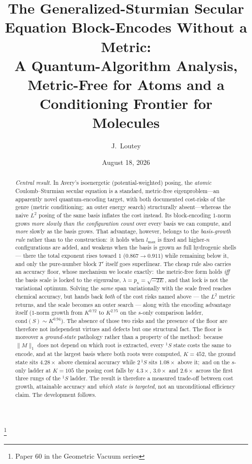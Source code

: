 \documentclass[aps,pra,twocolumn,superscriptaddress,longbibliography]{revtex4-2}
\newcommand{\gvq}[2]{#2}
\begin{document}
\title{The Generalized-Sturmian Secular Equation Block-Encodes Without a
Metric:\\
A Quantum-Algorithm Analysis, Metric-Free for Atoms and a
Conditioning Frontier for Molecules}
\thanks{Paper 60 in the Geometric Vacuum series}

\author{J.~Loutey}

\date{August 18, 2026}

\begin{abstract}
\emph{Central result.}  In Avery's isoenergetic (potential-weighted) posing,
the \emph{atomic} Coulomb--Sturmian secular equation is a standard,
metric-free eigenproblem---an apparently novel quantum-encoding target, with
both documented cost-risks of the genre (metric conditioning;\ an outer energy
search) structurally absent---whereas the naive $L^{2}$ posing of the same
basis inflates the cost instead.  Its block-encoding $1$-norm grows
\emph{more slowly than the configuration count} over every basis we can
compute, and \emph{more} slowly as the basis grows.  That advantage, however,
belongs to the \emph{basis-growth rule} rather than to the construction:\ it
holds when $l_{\max}$ is fixed and higher-$n$ configurations are added, and
weakens when the basis is grown as full hydrogenic shells --- there the total
exponent rises toward $1$ ($0.867\to0.911$) while remaining below it, and only
the pure-number block $T'$ itself goes superlinear.
The cheap rule also carries an accuracy floor, whose mechanism we
locate exactly:\ the metric-free form holds \emph{iff} the basis scale is locked
to the eigenvalue, $\lambda=p_\kappa=\sqrt{-2E}$, and that lock is not the
variational optimum.  Solving the \emph{same} span variationally with the scale
freed reaches chemical accuracy, but hands back \emph{both} of the cost risks
named above --- the $L^{2}$ metric returns, and the scale becomes an outer
search --- along with the encoding advantage itself ($1$-norm growth from
$K^{\gvq{p60_freescale_set_sonly}{0.72}}$ to $K^{2.75}$ on the $s$-only
comparison ladder, $\mathrm{cond}(S)\sim K^{0.94}$).  The absence of
those two risks and the presence of the floor are therefore not independent
virtues and defects but one structural fact.  The floor is moreover a
\emph{ground-state} pathology rather than a property of the method:\ because
$\|M\|_1$ does not depend on which root is extracted, every $^{1}S$ state costs
the same to encode, and at the largest basis where both roots were computed, $K=452$, the
ground state sits $\gvq{p60_gnd_ratio_k452}{4.28}\times$ above chemical accuracy
while $2\,^{1}S$ sits $\gvq{p60_exc_ratio_k452}{1.08}\times$ above it;\ and on
the $s$-only ladder at $K=105$ the posing cost falls by $4.3\times$, $3.0\times$ and $2.6\times$
across the first three rungs of the $^{1}S$ ladder.  The result is therefore a measured trade-off between cost growth,
attainable accuracy and \emph{which state is targeted}, not an unconditional
efficiency claim.  The development follows.


\end{abstract}
\end{document}

